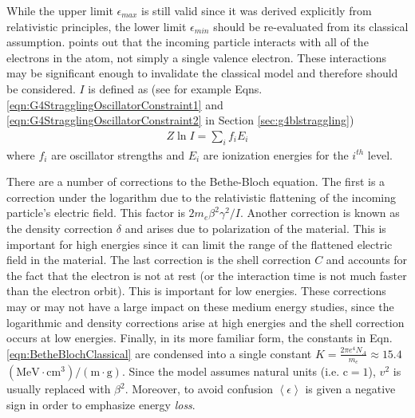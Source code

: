While the upper limit $\epsilon_{max}$ is still valid since it was derived explicitly from relativistic principles, the lower limit $\epsilon_{min}$ should be re-evaluated from its classical assumption. \cite{bichsel1968} points out that the incoming particle interacts with all of the electrons in the atom, not simply a single valence electron. These interactions may be significant enough to invalidate the classical model and therefore should be considered. $I$ is defined as (see for example Eqns. \ref{eqn:G4StragglingOscillatorConstraint1} and \ref{eqn:G4StragglingOscillatorConstraint2} in Section \ref{sec:g4blstraggling})
\begin{gather*}
Z \ln I = \sum_i f_i E_i
\end{gather*}
where $f_i$ are oscillator strengths and $E_i$ are ionization energies for the $i^{th}$ level.
\fi

There are a number of corrections to the Bethe-Bloch equation. The first is a correction under the logarithm due to the relativistic flattening of the incoming particle's electric field. This factor is  $2m_e \beta^2 \gamma^2 / I$. Another correction is known as the density correction $\delta$ and arises due to polarization of the material. This is important for high energies since it can limit the range of the flattened electric field in the material. The last correction is the shell correction $C$ and accounts for the fact that the electron is not at rest (or the interaction time is not much faster than the electron orbit). This is important for low energies. These corrections may or may not have a large impact on these medium energy studies, since the logarithmic and density corrections arise at high energies and the shell correction occurs at low energies. Finally, in its more familiar form, the constants in Eqn. \ref{eqn:BetheBlochClassical} are condensed into a single constant $K=\frac{2\pi e^4 N_A}{m_e}\approx 15.4$ $ (\text{MeV}\cdot \text{cm}^3)/(\text{m}\cdot \text{g})$. Since the model assumes natural units (i.e. $\text{c}=1$), $v^2$ is usually replaced with $\beta ^2$. Moreover, to avoid confusion $\left<\epsilon\right>$ is given a negative sign in order to emphasize energy \emph{loss}.

